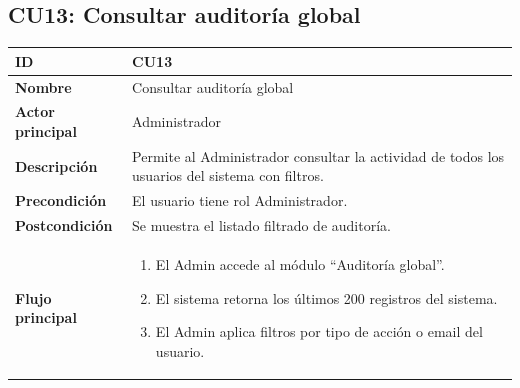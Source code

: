 \documentclass[11pt,a4paper]{article}
\begin{document}
\subsection*{CU13: Consultar auditoría global}
\begin{longtable}{|L{3.5cm}|L{10cm}|}
    \hline
    \textbf{ID}              & CU13                                                                                           \\ \hline
    \textbf{Nombre}          & Consultar auditoría global                                                                     \\ \hline
    \textbf{Actor principal} & Administrador                                                                                  \\ \hline
    \textbf{Descripción}     & Permite al Administrador consultar la actividad de todos los usuarios del sistema con filtros. \\ \hline
    \textbf{Precondición}    & El usuario tiene rol Administrador.                                                            \\ \hline
    \textbf{Postcondición}   & Se muestra el listado filtrado de auditoría.                                                   \\ \hline
    \textbf{Flujo principal} &
    \begin{enumerate}
        \item El Admin accede al módulo ``Auditoría global''.
        \item El sistema retorna los últimos 200 registros del sistema.
        \item El Admin aplica filtros por tipo de acción o email del usuario.
    \end{enumerate}                                                  \\ \hline
\end{longtable}

\end{document}
